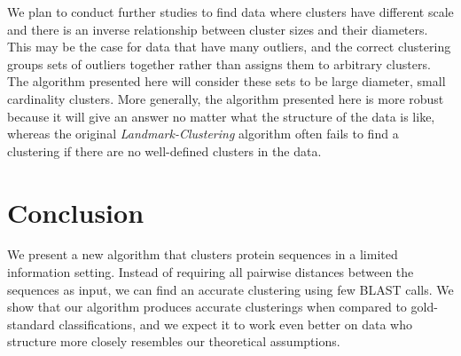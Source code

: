 \documentclass{llncs} \usepackage{algorithm}
\begin{document}
We plan to conduct further studies to find data where clusters have different scale and there is an inverse relationship between cluster sizes and their diameters.  This may be the case for data that have many outliers, and the correct clustering groups sets of outliers together rather than assigns them to arbitrary clusters.  The algorithm presented here will consider these sets to be large diameter, small cardinality clusters.  More generally, the algorithm presented here is more robust because it will give an answer no matter what the structure of the data is like, whereas the original \emph{Landmark-Clustering} algorithm often fails to find a clustering if there are no well-defined clusters in the data.

\section{Conclusion}

We present a new algorithm that clusters protein sequences in a limited information setting.  Instead of requiring all pairwise distances between the sequences as input, we can find an accurate clustering using few BLAST calls.  We show that our algorithm produces accurate clusterings when compared to gold-standard classifications, and we expect it to work even better on data who structure more closely resembles our theoretical assumptions.




\end{document}
